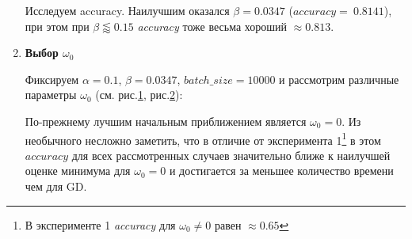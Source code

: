 \begin{enumerate}
	Исследуем accuracy.
	Наилучшим оказался $\beta=0.0347$ ({$accuracy =~0.8141$}), при этом при $\beta \lessapprox\!0.15$  {\itshape accuracy} тоже весьма хороший $\approx\!0.813$.

	\item {\bfseries  Выбор $\omega_0$}
	
	Фиксируем $\alpha = 0.1$, $\beta = 0.0347$, $batch\_size=10000$ и рассмотрим различные параметры $\omega_0$ (см. рис.\ref{eq:exp2_fig3}, рис.\ref{eq:exp2_fig4}):
	\begin{figure}[h]
		\caption{}
		\label{eq:exp2_fig3}
	\end{figure}
	
	\begin{figure}[h]
		\caption{}
		\label{eq:exp2_fig4}
	\end{figure}
	По-прежнему лучшим начальным приближением является $\omega_0=0$. Из необычного несложно заметить, что в отличие от эксперимента 1\footnote{В эксперименте 1 {\itshape accuracy} для $\omega_0 \neq 0$ равен $\approx 0.65$} в этом $accuracy$ для всех рассмотренных случаев значительно ближе к наилучшей оценке минимума для $\omega_0 = 0$ и достигается за меньшее количество времени чем для GD.


\end{enumerate}

